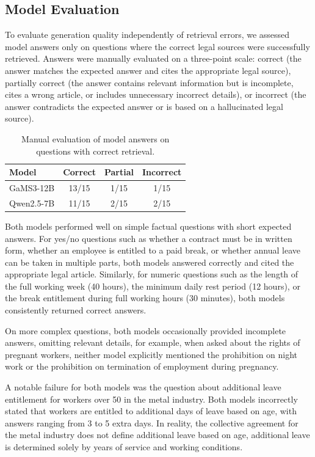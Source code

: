 \documentclass[fleqn,moreauthors,10pt]{ds_report}
\begin{document}
\subsection*{Model Evaluation}
To evaluate generation quality independently of retrieval errors, we assessed model answers only on questions where the correct legal sources were successfully retrieved. Answers were manually evaluated on a three-point scale: correct (the answer matches the expected answer and cites the appropriate legal source), partially correct (the answer contains relevant information but is incomplete, cites a wrong article, or includes unnecessary incorrect details), or incorrect (the answer contradicts the expected answer or is based on a hallucinated legal source).

\begin{table}[h]
\centering
\caption{Manual evaluation of model answers on questions with correct retrieval.}
\begin{tabular}{lccc}
\hline
\textbf{Model} & \textbf{Correct} & \textbf{Partial} & \textbf{Incorrect} \\
\hline
GaMS3-12B & 13/15 & 1/15 & 1/15 \\
Qwen2.5-7B & 11/15  & 2/15 & 2/15 \\
\hline
\end{tabular}
\label{tab:model_eval}
\end{table}

Both models performed well on simple factual questions with short expected answers. For yes/no questions such as whether a contract must be in written form, whether an employee is entitled to a paid break, or whether annual leave can be taken in multiple parts, both models answered correctly and cited the appropriate legal article. Similarly, for numeric questions such as the length of the full working week (40 hours), the minimum daily rest period (12 hours), or the break entitlement during full working hours (30 minutes), both models consistently returned correct answers.

On more complex questions, both models occasionally provided incomplete answers, omitting relevant details, for example, when asked about the rights of pregnant workers, neither model explicitly mentioned the prohibition on night work or the prohibition on termination of employment during pregnancy.

A notable failure for both models was the question about additional leave entitlement for workers over 50 in the metal industry. Both models incorrectly stated that workers are entitled to additional days of leave based on age, with answers ranging from 3 to 5 extra days. In reality, the collective agreement for the metal industry does not define additional leave based on age, additional leave is determined solely by years of service and working conditions.
\end{document}

